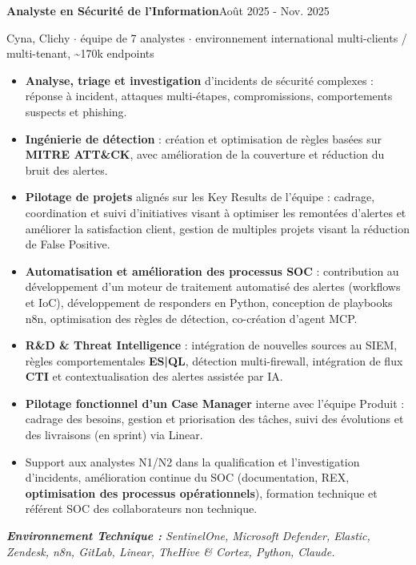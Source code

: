 \documentclass[10pt,a4paper]{article}
\newlength{\gEntry}      \setlength{\gEntry}      {2.4pt}  %
\newcommand{\cventry}[3]{%
  \vspace{\gEntry}%
  \textbf{#1}\hfill #2\par
  #3\par
}
\newenvironment{cvitems}{%
  \begin{itemize}[leftmargin=14.9pt, labelsep=8.4pt, labelwidth=0pt,
                  align=left, itemsep=0pt, topsep=0pt, parsep=0pt,
                  partopsep=0pt, label={\makebox[0pt][l]{\textbullet}}]%
}{\end{itemize}}
\newcommand{\envtech}[1]{%
  {\small\textit{\textbf{Environnement Technique :} #1}\par}%
}
\newcommand{\sep}{\ensuremath{\cdot}}
\begin{document}
\cventry{Analyste en Sécurité de l’Information}{Août 2025 - Nov. 2025}{Cyna, Clichy
 \sep{} équipe de 7 analystes \sep{} environnement international multi-clients / multi-tenant,
  \textasciitilde{}170k endpoints}
\begin{cvitems}
  \item \textbf{Analyse, triage et investigation} d'incidents de sécurité
        complexes : réponse à incident, attaques multi-étapes, compromissions,
        comportements suspects et phishing.
  \item \textbf{Ingénierie de détection} : création et optimisation de règles
        basées sur \textbf{MITRE ATT\&CK}, avec amélioration de la couverture et
        réduction du bruit des alertes.
\item \textbf{Pilotage de projets} alignés sur les Key Results de l'équipe :
      cadrage, coordination et suivi d'initiatives visant à optimiser les
      remontées d'alertes et améliorer la satisfaction client, 
      gestion de multiples projets visant la réduction de False Positive.
\item \textbf{Automatisation et amélioration des processus SOC} :
      contribution au développement d'un moteur de traitement automatisé des
      alertes (workflows et IoC), développement de responders en Python,
      conception de playbooks n8n, optimisation des règles de détection, co-création d'agent MCP.
  \item \textbf{R\&D \& Threat Intelligence} : intégration de nouvelles sources
        au SIEM, règles comportementales \textbf{ES|QL}, détection
        multi-firewall, intégration de flux \textbf{CTI} et contextualisation
        des alertes assistée par IA.
  \item \textbf{Pilotage fonctionnel d'un Case Manager} interne avec l'équipe
        Produit : cadrage des besoins, gestion et priorisation des tâches,
        suivi des évolutions et des livraisons (en sprint) via Linear.
  \item Support aux analystes N1/N2 dans la qualification et l'investigation
        d'incidents, amélioration continue du SOC (documentation, REX,
        \textbf{optimisation des processus opérationnels}),  formation technique et référent SOC des collaborateurs non technique.
\end{cvitems}
\envtech{SentinelOne, Microsoft Defender, Elastic, Zendesk, n8n, GitLab, Linear, TheHive \& Cortex, Python, Claude.}
\end{document}
